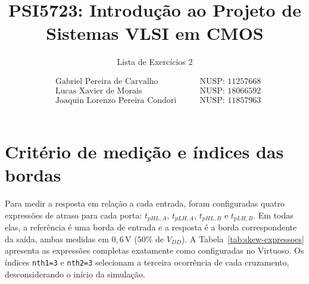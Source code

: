\documentclass[a4paper]{article}
\author{
\begin{align*}
    &\text{Gabriel Pereira de Carvalho} \qquad &\text{NUSP: 11257668} \\
    &\text{Lucas Xavier de Morais} \qquad &\text{NUSP: 18066592} \\
    &\text{Joaquin Lorenzo Pereira Condori} \qquad &\text{NUSP: 11857963}
\end{align*}
}
\date{}
\title{PSI5723: Introdução ao Projeto de Sistemas VLSI em CMOS}
\subtitle{Lista de Exercícios 2}
\begin{document}
\maketitle

\tableofcontents
\newpage

\section{Critério de medição e índices das bordas}

Para medir a resposta em relação a cada entrada, foram configuradas quatro expressões de atraso para cada porta: $t_{pHL,A}$, $t_{pLH,A}$, $t_{pHL,B}$ e $t_{pLH,B}$. Em todas elas, a referência é uma borda de entrada e a resposta é a borda correspondente da saída, ambas medidas em $0{,}6\,\mathrm{V}$ ($50\%$ de $V_{DD}$). A Tabela~\ref{tab:skew-expressoes} apresenta as expressões completas exatamente como configuradas no Virtuoso. Os índices \texttt{nth1=3} e \texttt{nth2=3} selecionam a terceira ocorrência de cada cruzamento, desconsiderando o início da simulação.
\end{document}
